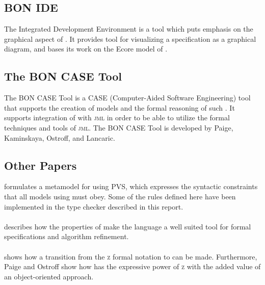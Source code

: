 \subsection{BON IDE}
The \bon{} Integrated Development Environment is a tool which puts emphasis on the graphical aspect of \bon{} \cite{bonide}. It provides tool for visualizing a \bon{} specification as a graphical diagram, and bases its work on the Ecore model of \bon{}.

\subsection{The BON CASE Tool}
The BON CASE Tool is a CASE (Computer-Aided Software Engineering) tool that supports the creation of \bon{} models and the formal reasoning of such \cite{boncase}. It supports integration of \bon{} with \textsc{jml} in order to be able to utilize the formal techniques and tools of \textsc{jml}. The BON CASE Tool is developed by Paige, Kaminskaya, Ostroff, and Lancaric.

\subsection{Other Papers}
\cite{ostroff2001} formulates a metamodel for \bon{} using PVS, which expresses the syntactic constraints that all models using \bon{} must obey. Some of the rules defined here have been implemented in the type checker described in this report.

\paragraph{}
\cite{ostroff1999} describes how the properties of \bon{} make the language a well suited tool for formal specifications and algorithm refinement.

\paragraph{}
\cite{ostroff1998} shows how a transition from the \textsc{z} formal notation to \bon{} can be made. Furthermore, Paige and Ostroff show how \bon{} has the expressive power of \textsc{z} with the added value of an object-oriented approach.
